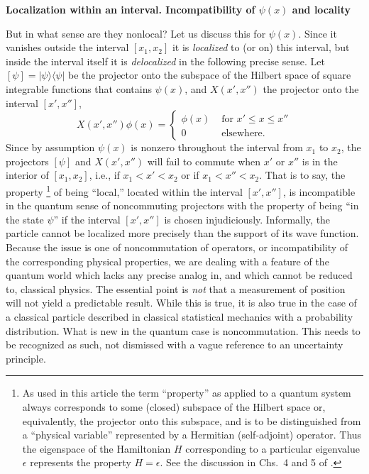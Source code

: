 \documentclass[12pt]{article} %
\def\outl#1{\par{\medskip\noindent\hspace*{.5cm}\bf
      \mathversion{bold}#1\mathversion{normal}\smallskip} }
\def\np{} \def\xa{} \def\xb{} \def\xn{} \def\xp{}
\def\outl#1{} \def\np{} \def\xa{} \def\xb{} \def\xn{} \def\xp{}
\def\outl#1{\par{\medskip\noindent\hspace*{.5cm}\bf
      \mathversion{bold}#1\mathversion{normal}\smallskip} }
\def\np{\newpage }\def\xn{\nopagebreak }\def\xp{\pagebreak }
\newcommand{\dya}[1]{|#1\rgl\lgl#1|}
\newcommand{\lgl}{\langle }
\newcommand{\rgl}{\rangle }
\newcommand{\ep}{\epsilon}
\begin{document}
\xb
\outl{Localization within an interval. Incompatibility of $\psi(x)$ and
  locality}
\xa



But in what sense are they nonlocal? Let us discuss this for $\psi(x)$. Since
it vanishes outside the interval $[x_1,x_2]$ it is \emph{localized} to (or on)
this interval, but inside the interval itself it is \emph{delocalized} in the
following precise sense.  Let $[\psi] =\dya{\psi}$ be the projector onto the
subspace of the Hilbert space of square integrable functions that contains
$\psi(x)$, and $X(x',x'')$ the projector onto the interval $[x',x'']$,
\begin{equation}
  X(x',x'')\phi(x) = 
\begin{cases}
\phi(x) &\text{ for $x'\leq x \leq x''$}\\ 
0 &\text{ elsewhere.}
\end{cases}
\label{eqn1}
\end{equation}
Since by assumption $\psi(x)$ is nonzero throughout the interval from $x_1$ to
$x_2$, the projectors $[\psi]$ and $X(x',x'')$ will fail to commute when $x'$
or $x''$ is in the interior of $[x_1,x_2]$, i.e., if $x_1<x'<x_2$ or if $x_1 <
x'' < x_2$.  That is to say, the property%
\footnote{As used in this article the term ``property'' as applied to a
  quantum system always corresponds to some (closed) subspace of the Hilbert
  space or, equivalently, the projector onto this subspace, and is to be
  distinguished from a ``physical variable'' represented by a Hermitian
  (self-adjoint) operator.  Thus the eigenspace of the Hamiltonian $H$
  corresponding to a particular eigenvalue $\ep$ represents the property
  $H=\ep$.  See the discussion in Chs.~4 and 5 of \cite{Grff02c}.} %
of being ``local,'' located within the interval $[x',x'']$, is incompatible in
the quantum sense of noncommuting projectors with the property of being ``in
the state $\psi$'' if the interval $[x',x'']$ is chosen
injudiciously. Informally, the particle cannot be localized more precisely
than the support of its wave function.  Because the issue is one of
noncommutation of operators, or incompatibility of the corresponding physical
properties, we are dealing with a feature of the quantum world
which lacks any precise analog in, and which cannot be reduced to, classical
physics.  The essential point is \emph{not} that a measurement of position
will not yield a predictable result.  While this is true, it is also true in
the case of a classical particle described in classical statistical mechanics
with a probability distribution.  What is new in the quantum case is
noncommutation. This needs to be recognized as such, not dismissed with a
vague reference to an uncertainty principle.
\end{document}
